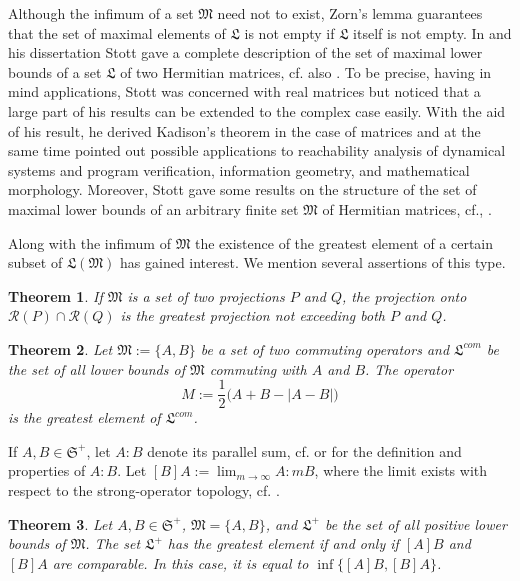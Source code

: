 \documentclass[12pt, a4paper, reqno, twoside]{amsart}
\numberwithin{equation}{section}
\newcommand{\frakS}{\mathfrak S}
\newcommand{\frakL}{\mathfrak L}
\newcommand{\frakM}{\mathfrak M}
\newcommand{\cf}{\mbox{cf.}\xspace}
\newtheorem{theorem}{Theorem}[section]
\theoremstyle{definition}
\theoremstyle{remark}
\theoremstyle{mystyle}
\begin{document}
Although the infimum of a set $\frakM$ need not to exist, Zorn's lemma
guarantees that the set of maximal elements of $\frakL$ is not empty
if $\frakL$ itself is not empty. In \cite{Stott2016arxiv} and his
dissertation \cite[Sec.~2.3]{Stott2017dis} Stott gave a complete
description  of the  set of maximal lower bounds of a set $\frakL$ of
two  Hermitian matrices,  \cf also \cite{GaubertStott2017}. To be
precise, having in mind applications, Stott was concerned with real
matrices but noticed that a large part of his results can be
extended to the complex case easily. With the aid of his result, he
derived Kadison's theorem in the case of matrices and at the same time
pointed out possible applications to reachability analysis of
dynamical  systems and program verification, information geometry, and
mathematical morphology. Moreover, Stott gave some results on the
structure  of the set of maximal lower bounds of an arbitrary finite
set  $\frakM$ of Hermitian matrices, \cf \cite[Sect.~2.6]{Stott2017dis}, \cite[Thm.~1]{GaubertStott2017}.

Along with the infimum of $\frakM$ the existence of the greatest element
of a certain subset of $\frakL(\frakM)$ has gained interest. We
mention several assertions of this type.

\begin{theorem}
\label{thm1.1}
If $\frakM$ is a set of two projections $P$ and $Q$, the
projection onto $\mathscr R(P)\cap\mathscr R(Q)$ is the greatest
projection not exceeding both $P$ and $Q$.
\end{theorem}  

\begin{theorem}
\label{thm1.2}
Let $\frakM:=\{A,B\}$ be a set of two commuting operators and
$\frakL^{com}$ be the set of all lower bounds of $\frakM$ commuting
with $A$ and $B$. The operator
\begin{equation}
\label{eq1.1}
M:=\frac{1}{2}\bigl(A+B-|A-B|\bigr)
\end{equation}
is the greatest element of $\frakL^{com}$.
\end{theorem}  

If $A,B\in\frakS^{+}$, let $A:B$ denote its parallel sum,
\cf \cite{Anderson1971} or \cite{PekarevSmuljan1976} for the definition
and properties of $A:B$. Let $[B]A:=\lim_{m\to\infty}A:mB$, where the
limit exists with respect to the strong-operator topology, \cf
\cite{Ando1999}.

\begin{theorem}
\label{thm1.3}
Let $A,B\in\frakS^{+}$, $\frakM=\{A,B\}$, and $\frakL^{+}$ be the set
of all positive lower bounds of $\frakM$. The set $\frakL^{+}$ has the
greatest element if and only if $[A]B$ and $[B]A$ are comparable. In
this case, it is equal to $\inf\bigl\{[A]B,[B]A\bigr\}$.
\end{theorem}
\end{document}
